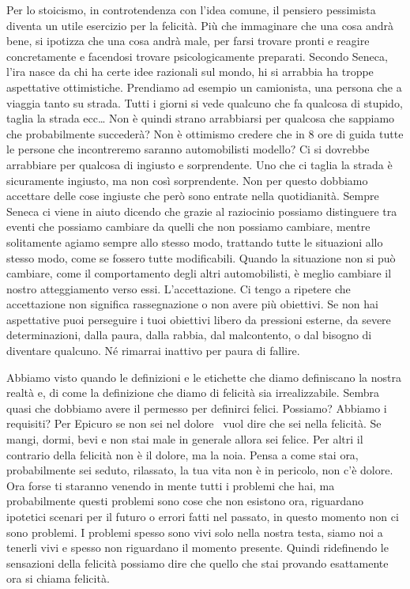 \documentclass[12pt]{book} %
\begin{document}
Per lo stoicismo, in controtendenza con l'idea comune, il pensiero pessimista diventa un utile
esercizio per la felicità. Più che immaginare che una cosa andrà bene, si ipotizza che una cosa andrà male, per farsi
trovare pronti e reagire concretamente e facendosi trovare psicologicamente preparati. Secondo Seneca, l'ira nasce da
chi ha certe idee razionali sul mondo, hi si arrabbia ha troppe aspettative ottimistiche. Prendiamo ad esempio un
camionista, una persona che a viaggia tanto su strada. Tutti i giorni si vede qualcuno che fa qualcosa di stupido,
taglia la strada ecc… Non è quindi strano arrabbiarsi per qualcosa che sappiamo che probabilmente succederà? Non è
ottimismo credere che in 8 ore di guida tutte le persone che incontreremo saranno automobilisti modello? Ci si dovrebbe
arrabbiare per qualcosa di ingiusto e sorprendente. Uno che ci taglia la strada è sicuramente ingiusto, ma non così
sorprendente. Non per questo dobbiamo accettare delle cose ingiuste che però sono entrate nella quotidianità. Sempre
Seneca ci viene in aiuto dicendo che grazie al raziocinio possiamo distinguere tra eventi che possiamo cambiare da
quelli che non possiamo cambiare, mentre solitamente agiamo sempre allo stesso modo, trattando tutte le situazioni allo
stesso modo, come se fossero tutte modificabili. Quando la situazione non si può cambiare, come il comportamento degli
altri automobilisti, è meglio cambiare il nostro atteggiamento verso essi. L'accettazione. Ci
tengo a ripetere che accettazione non significa rassegnazione o non avere più obiettivi. Se non hai aspettative puoi
perseguire i tuoi obiettivi libero da pressioni esterne, da severe determinazioni, dalla paura, dalla rabbia, dal
malcontento, o dal bisogno di diventare qualcuno. Né rimarrai inattivo per paura di fallire.

Abbiamo visto quando le definizioni e le etichette che diamo definiscano la nostra realtà e, di come la definizione che
diamo di felicità sia irrealizzabile. Sembra quasi che dobbiamo avere il permesso per definirci felici. Possiamo?
Abbiamo i requisiti? Per Epicuro se non sei nel dolore \ vuol dire che sei nella felicità. Se mangi, dormi, bevi e non
stai male in generale allora sei felice. Per altri il contrario della felicità non è il dolore, ma la noia. Pensa a
come stai ora, probabilmente sei seduto, rilassato, la tua vita non è in pericolo, non c'è dolore.
Ora forse ti staranno venendo in mente tutti i problemi che hai, ma probabilmente questi problemi sono cose che non
esistono ora, riguardano ipotetici scenari per il futuro o errori fatti nel passato, in questo momento non ci sono
problemi. I problemi spesso sono vivi solo nella nostra testa, siamo noi a tenerli vivi e spesso non riguardano il
momento presente. Quindi ridefinendo le sensazioni della felicità possiamo dire che quello che stai provando
esattamente ora si chiama felicità. 
\end{document}
